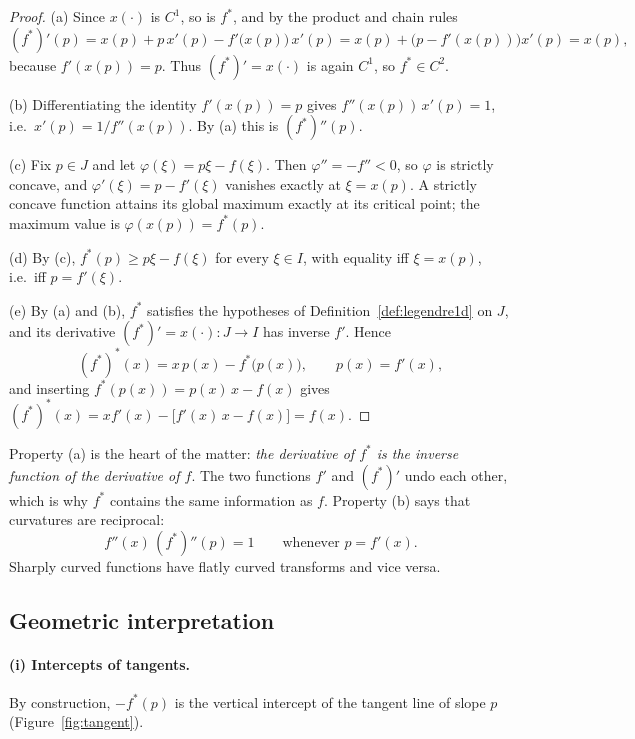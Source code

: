 \documentclass[11pt,a4paper]{article}
\theoremstyle{plain}
\theoremstyle{definition}
\theoremstyle{remark}
\begin{document}
\begin{proof}
(a) Since $x(\cdot)$ is $C^1$, so is $f^*$, and by the product and chain rules
\[
  (f^*)'(p)=x(p)+p\,x'(p)-f'\bigl(x(p)\bigr)\,x'(p)
          =x(p)+\bigl(p-f'(x(p))\bigr)x'(p)=x(p),
\]
because $f'(x(p))=p$.  Thus $(f^*)'=x(\cdot)$ is again $C^1$, so
$f^*\in C^2$.

(b) Differentiating the identity $f'(x(p))=p$ gives
$f''(x(p))\,x'(p)=1$, i.e.\ $x'(p)=1/f''(x(p))$.  By (a) this is
$(f^*)''(p)$.

(c) Fix $p\in J$ and let $\varphi(\xi)=p\xi-f(\xi)$.  Then
$\varphi''=-f''<0$, so $\varphi$ is strictly concave, and
$\varphi'(\xi)=p-f'(\xi)$ vanishes exactly at $\xi=x(p)$.  A strictly
concave function attains its global maximum exactly at its critical point;
the maximum value is $\varphi(x(p))=f^*(p)$.

(d) By (c), $f^*(p)\ge p\xi-f(\xi)$ for every $\xi\in I$, with equality iff
$\xi=x(p)$, i.e.\ iff $p=f'(\xi)$.

(e) By (a) and (b), $f^*$ satisfies the hypotheses of
Definition~\ref{def:legendre1d} on $J$, and its derivative
$(f^*)'=x(\cdot)\colon J\to I$ has inverse $f'$.  Hence
\[
  (f^*)^*(x)=x\,p(x)-f^*\bigl(p(x)\bigr),\qquad p(x)=f'(x),
\]
and inserting $f^*(p(x))=p(x)\,x-f(x)$ gives
$(f^*)^*(x)=x f'(x)-\bigl[f'(x)\,x-f(x)\bigr]=f(x)$.
\end{proof}

Property (a) is the heart of the matter: \emph{the derivative of $f^*$ is the
inverse function of the derivative of $f$}.  The two functions $f'$ and
$(f^*)'$ undo each other, which is why $f^*$ contains the same information as
$f$.  Property (b) says that curvatures are reciprocal:
\[
  f''(x)\,(f^*)''(p)=1\qquad\text{whenever } p=f'(x).
\]
Sharply curved functions have flatly curved transforms and vice versa.

\subsection{Geometric interpretation}\label{sec:geometry}

\paragraph{(i) Intercepts of tangents.}
By construction, $-f^*(p)$ is the vertical intercept of the tangent line of
slope $p$ (Figure~\ref{fig:tangent}).
\end{document}
